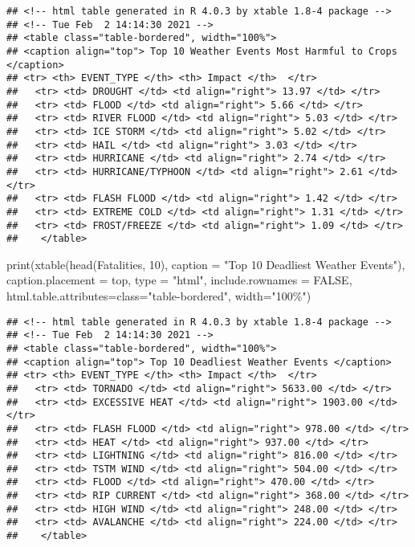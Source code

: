 \documentclass[
]{article}
\newenvironment{Shaded}{\begin{snugshade}}{\end{snugshade}}
\newcommand{\AttributeTok}[1]{\textcolor[rgb]{0.77,0.63,0.00}{#1}}
\newcommand{\ConstantTok}[1]{\textcolor[rgb]{0.00,0.00,0.00}{#1}}
\newcommand{\DecValTok}[1]{\textcolor[rgb]{0.00,0.00,0.81}{#1}}
\newcommand{\FunctionTok}[1]{\textcolor[rgb]{0.00,0.00,0.00}{#1}}
\newcommand{\NormalTok}[1]{#1}
\newcommand{\StringTok}[1]{\textcolor[rgb]{0.31,0.60,0.02}{#1}}
\begin{document}
\begin{verbatim}
## <!-- html table generated in R 4.0.3 by xtable 1.8-4 package -->
## <!-- Tue Feb  2 14:14:30 2021 -->
## <table class="table-bordered", width="100%">
## <caption align="top"> Top 10 Weather Events Most Harmful to Crops </caption>
## <tr> <th> EVENT_TYPE </th> <th> Impact </th>  </tr>
##   <tr> <td> DROUGHT </td> <td align="right"> 13.97 </td> </tr>
##   <tr> <td> FLOOD </td> <td align="right"> 5.66 </td> </tr>
##   <tr> <td> RIVER FLOOD </td> <td align="right"> 5.03 </td> </tr>
##   <tr> <td> ICE STORM </td> <td align="right"> 5.02 </td> </tr>
##   <tr> <td> HAIL </td> <td align="right"> 3.03 </td> </tr>
##   <tr> <td> HURRICANE </td> <td align="right"> 2.74 </td> </tr>
##   <tr> <td> HURRICANE/TYPHOON </td> <td align="right"> 2.61 </td> </tr>
##   <tr> <td> FLASH FLOOD </td> <td align="right"> 1.42 </td> </tr>
##   <tr> <td> EXTREME COLD </td> <td align="right"> 1.31 </td> </tr>
##   <tr> <td> FROST/FREEZE </td> <td align="right"> 1.09 </td> </tr>
##    </table>
\end{verbatim}

\begin{Shaded}
\begin{Highlighting}[]
\FunctionTok{print}\NormalTok{(}\FunctionTok{xtable}\NormalTok{(}\FunctionTok{head}\NormalTok{(Fatalities, }\DecValTok{10}\NormalTok{),}
             \AttributeTok{caption =} \StringTok{"Top 10 Deadliest Weather Events"}\NormalTok{),}
             \AttributeTok{caption.placement =} \StringTok{\textquotesingle{}top\textquotesingle{}}\NormalTok{,}
             \AttributeTok{type =} \StringTok{"html"}\NormalTok{,}
             \AttributeTok{include.rownames =} \ConstantTok{FALSE}\NormalTok{,}
             \AttributeTok{html.table.attributes=}\StringTok{\textquotesingle{}class="table{-}bordered", width="100\%"\textquotesingle{}}\NormalTok{)}
\end{Highlighting}
\end{Shaded}

\begin{verbatim}
## <!-- html table generated in R 4.0.3 by xtable 1.8-4 package -->
## <!-- Tue Feb  2 14:14:30 2021 -->
## <table class="table-bordered", width="100%">
## <caption align="top"> Top 10 Deadliest Weather Events </caption>
## <tr> <th> EVENT_TYPE </th> <th> Impact </th>  </tr>
##   <tr> <td> TORNADO </td> <td align="right"> 5633.00 </td> </tr>
##   <tr> <td> EXCESSIVE HEAT </td> <td align="right"> 1903.00 </td> </tr>
##   <tr> <td> FLASH FLOOD </td> <td align="right"> 978.00 </td> </tr>
##   <tr> <td> HEAT </td> <td align="right"> 937.00 </td> </tr>
##   <tr> <td> LIGHTNING </td> <td align="right"> 816.00 </td> </tr>
##   <tr> <td> TSTM WIND </td> <td align="right"> 504.00 </td> </tr>
##   <tr> <td> FLOOD </td> <td align="right"> 470.00 </td> </tr>
##   <tr> <td> RIP CURRENT </td> <td align="right"> 368.00 </td> </tr>
##   <tr> <td> HIGH WIND </td> <td align="right"> 248.00 </td> </tr>
##   <tr> <td> AVALANCHE </td> <td align="right"> 224.00 </td> </tr>
##    </table>
\end{verbatim}
\end{document}
